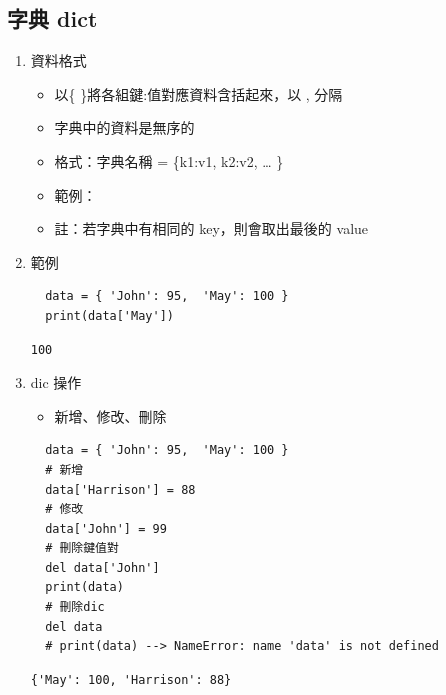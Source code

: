 \documentclass[a4paper,12pt]{article}
\begin{document}
\subsection{字典 dict}
\label{sec:org07327f6}
\begin{enumerate}
\item 資料格式
\label{sec:org68492a2}
\begin{itemize}
\item 以\{ \}將各組鍵:值對應資料含括起來，以 , 分隔\\
\item 字典中的資料是無序的\\
\item 格式：字典名稱 = \{k1:v1, k2:v2,  … \}\\
\item 範例：\\
\item 註：若字典中有相同的 key，則會取出最後的 value\\
\end{itemize}

\item 範例
\label{sec:orgf81efc3}
\lstset{breaklines=true,language=Python,label= ,caption= ,captionpos=b,firstnumber=1,numbers=left}
\begin{lstlisting}
  data = { 'John': 95,  'May': 100 }
  print(data['May'])
\end{lstlisting}

\begin{verbatim}
100
\end{verbatim}

\item dic 操作
\label{sec:org33b6059}
\begin{itemize}
\item 新增、修改、刪除\\
\end{itemize}
\lstset{breaklines=true,language=Python,label= ,caption= ,captionpos=b,firstnumber=1,numbers=left}
\begin{lstlisting}
  data = { 'John': 95,  'May': 100 }
  # 新增
  data['Harrison'] = 88
  # 修改
  data['John'] = 99
  # 刪除鍵值對
  del data['John']
  print(data)
  # 刪除dic
  del data
  # print(data) --> NameError: name 'data' is not defined
\end{lstlisting}

\begin{verbatim}
{'May': 100, 'Harrison': 88}
\end{verbatim}


\end{enumerate}
\end{document}
